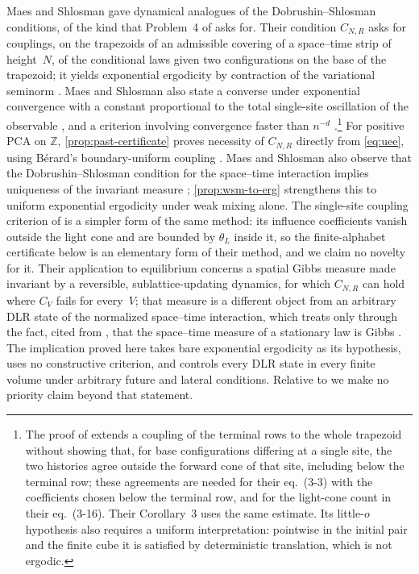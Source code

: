 \documentclass[11pt]{article}
\theoremstyle{plain}
\theoremstyle{definition}
\theoremstyle{remark}
\newcommand{\Z}{\mathbb{Z}}
\begin{document}
Maes and Shlosman \cite{MS91} gave dynamical analogues of the Dobrushin--Shlosman conditions, of the kind that Problem~4 of \cite{LMS90} asks for. Their condition $C_{N,R}$ asks for couplings, on the trapezoids of an admissible covering of a space--time strip of height~$N$, of the conditional laws given two configurations on the base of the trapezoid; it yields exponential ergodicity by contraction of the variational seminorm \cite[Section~3, Main Theorem]{MS91}. Maes and Shlosman also state a converse under exponential convergence with a constant proportional to the total single-site oscillation of the observable \cite[Theorem~2]{MS91}, and a criterion involving convergence faster than $n^{-d}$ \cite[Corollary~3]{MS91}.\footnote{The proof of \cite[Theorem~2, pp.~242--243]{MS91} extends a coupling of the terminal rows to the whole trapezoid without showing that, for base configurations differing at a single site, the two histories agree outside the forward cone of that site, including below the terminal row; these agreements are needed for their eq.~(3-3) with the coefficients chosen below the terminal row, and for the light-cone count in their eq.~(3-16). Their Corollary~3 uses the same estimate. Its little-$o$ hypothesis also requires a uniform interpretation: pointwise in the initial pair and the finite cube it is satisfied by deterministic translation, which is not ergodic.} For positive PCA on $\Z$, \cref{prop:past-certificate} proves necessity of $C_{N,R}$ directly from \eqref{eq:uee}, using B\'erard's boundary-uniform coupling \cite[Lemma~8]{Berard23}. Maes and Shlosman also observe that the Dobrushin--Shlosman condition for the space--time interaction implies uniqueness of the invariant measure \cite[p.~235]{MS91}; \cref{prop:wsm-to-erg} strengthens this to uniform exponential ergodicity under weak mixing alone. The single-site coupling criterion of \cite[Theorem~C]{MS93} is a simpler form of the same method: its influence coefficients vanish outside the light cone and are bounded by $\theta_L$ inside it, so the finite-alphabet certificate below is an elementary form of their method, and we claim no novelty for it. Their application to equilibrium \cite[Section~4, Example~3]{MS91} concerns a spatial Gibbs measure made invariant by a reversible, sublattice-updating dynamics, for which $C_{N,R}$ can hold where $C_V$ fails for every~$V$; that measure is a different object from an arbitrary DLR state of the normalized space--time interaction, which \cite{MS91} treats only through the fact, cited from \cite{GKLM89}, that the space--time measure of a stationary law is Gibbs \cite[p.~234]{MS91}. The implication proved here takes bare exponential ergodicity as its hypothesis, uses no constructive criterion, and controls every DLR state in every finite volume under arbitrary future and lateral conditions. Relative to \cite{MS91,MS93} we make no priority claim beyond that statement.
\end{document}
